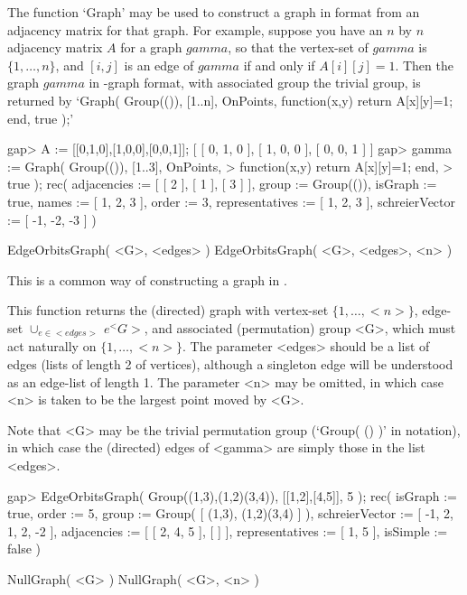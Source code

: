 The function `Graph' may be used to construct a graph in {\GRAPE} format
from an adjacency matrix
for that graph. For
example, suppose you have an $n$ by $n$ adjacency matrix $A$ for a graph
$gamma$, so that the vertex-set of $gamma$ is $\{1,\ldots,n\}$, and
$[i,j]$ is an edge of $gamma$ if and only if $A[i][j]=1$.  Then the graph
$gamma$ in {\GRAPE}-graph format, with associated group the trivial group,
is returned by `Graph( Group(()), [1..n], OnPoints, function(x,y) return
A[x][y]=1; end, true );'

\beginexample
gap> A := [[0,1,0],[1,0,0],[0,0,1]];
[ [ 0, 1, 0 ], [ 1, 0, 0 ], [ 0, 0, 1 ] ]
gap> gamma := Graph( Group(()), [1..3], OnPoints,
>        function(x,y) return A[x][y]=1; end,
>        true );
rec( adjacencies := [ [ 2 ], [ 1 ], [ 3 ] ], group := Group(()), 
  isGraph := true, names := [ 1, 2, 3 ], order := 3,
  representatives := [ 1, 2, 3 ], schreierVector := [ -1, -2, -3 ] )
\endexample


\>EdgeOrbitsGraph( <G>, <edges> )
\>EdgeOrbitsGraph( <G>, <edges>, <n> )

This is a common way of constructing a graph in {\GRAPE}.

This function returns the (directed) graph with vertex-set $\{1,\ldots,
<n>\}$, edge-set $\cup_{e\in <edges>}\, e^<G>$, and associated
(permutation) group <G>, which must act naturally on $\{1,\ldots,<n>\}$.
The parameter <edges> should be a list of edges (lists of length 2 of
vertices), although a singleton edge will be understood as an edge-list
of length 1. The parameter <n> may be omitted, in which case <n> is
taken to be the largest point moved by <G>.

Note that <G> may be the trivial permutation group (`Group( () )' in
{\GAP} notation), in which case the (directed) edges of <gamma> are
simply those in the list <edges>.

\beginexample
gap> EdgeOrbitsGraph( Group((1,3),(1,2)(3,4)), [[1,2],[4,5]], 5 );
rec(
  isGraph := true,
  order := 5,
  group := Group( [ (1,3), (1,2)(3,4) ] ),
  schreierVector := [ -1, 2, 1, 2, -2 ],
  adjacencies := [ [ 2, 4, 5 ], [  ] ],
  representatives := [ 1, 5 ],
  isSimple := false )
\endexample


\>NullGraph( <G> )
\>NullGraph( <G>, <n> )


